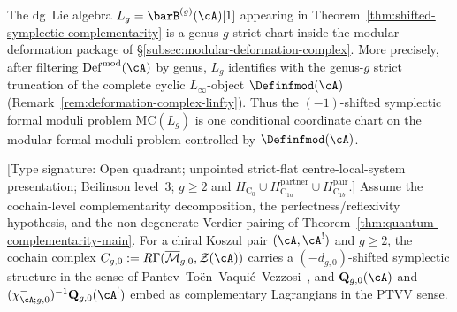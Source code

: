 \begin{remark}
\label{rem:genuswise-strictification}
The dg~Lie algebra $L_g = \barB^{(g)}(\cA)[1]$ appearing in
Theorem~\ref{thm:shifted-symplectic-complementarity} is a genus-$g$
strict chart inside the modular deformation package of
\S\ref{subsec:modular-deformation-complex}. More precisely, after
filtering $\operatorname{Def}^{\mathrm{mod}}(\cA)$ by genus, $L_g$
identifies with the genus-$g$ strict truncation of the complete
cyclic $L_\infty$-object $\Definfmod(\cA)$
(Remark~\ref{rem:deformation-complex-linfty}). Thus the
$(-1)$-shifted symplectic formal moduli problem $\mathrm{MC}(L_g)$ is
one conditional coordinate chart on the modular formal moduli problem
controlled by $\Definfmod(\cA)$.
\end{remark}

\begin{proposition}
\label{prop:ptvv-lagrangian}
\textup{[Type signature: Open quadrant; unpointed strict-flat
centre-local-system presentation; Beilinson level~3; \(g\geq2\) and
\(H_{\mathrm C_0}\cup H_{\mathrm C_{1a}}^{\mathrm{partner}}
\cup H_{\mathrm C_{1b}}^{\mathrm{pair}}\).]}
Assume the cochain-level complementarity decomposition, the
perfectness/reflexivity hypothesis, and the non-degenerate Verdier pairing of
Theorem~\textup{\ref{thm:quantum-complementarity-main}}. For a chiral
Koszul pair $(\cA, \cA^!)$ and $g \geq 2$, the cochain
complex
$C_{g,0} := R\Gamma(\overline{\mathcal{M}}_{g,0}, \mathcal{Z}(\cA))$
carries a $(-d_{g,0})$-shifted symplectic structure in the sense of
Pantev--To\"en--Vaqui\'e--Vezzosi~\cite{PTVV13}, and
\(\mathbf{Q}_{g,0}(\cA)\) and
\((\chi^-_{\cA;g,0})^{-1}\mathbf{Q}_{g,0}(\cA^!)\) embed as complementary
Lagrangians in the
PTVV sense.
\end{proposition}

